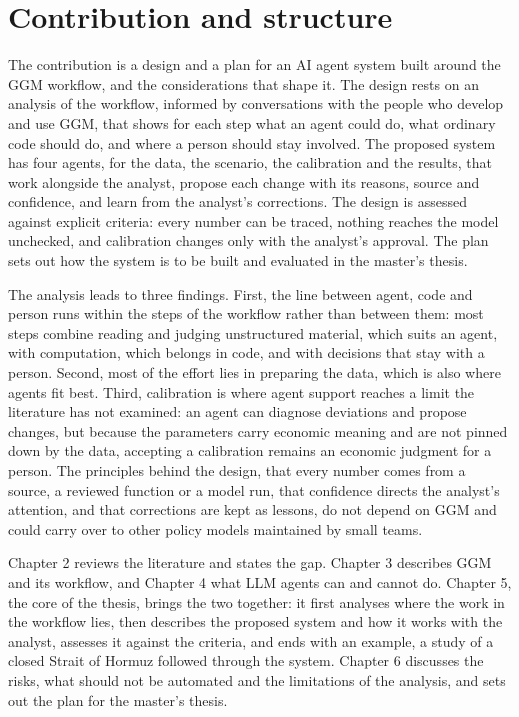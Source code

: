 \section{Contribution and structure}

The contribution is a design and a plan for an AI agent system built around the GGM workflow, and the considerations that shape it.
The design rests on an analysis of the workflow, informed by conversations with the people who develop and use GGM, that shows for each step what an agent could do, what ordinary code should do, and where a person should stay involved.
The proposed system has four agents, for the data, the scenario, the calibration and the results, that work alongside the analyst, propose each change with its reasons, source and confidence, and learn from the analyst's corrections.
The design is assessed against explicit criteria: every number can be traced, nothing reaches the model unchecked, and calibration changes only with the analyst's approval.
The plan sets out how the system is to be built and evaluated in the master's thesis.

The analysis leads to three findings.
First, the line between agent, code and person runs within the steps of the workflow rather than between them: most steps combine reading and judging unstructured material, which suits an agent, with computation, which belongs in code, and with decisions that stay with a person.
Second, most of the effort lies in preparing the data, which is also where agents fit best.
Third, calibration is where agent support reaches a limit the literature has not examined: an agent can diagnose deviations and propose changes, but because the parameters carry economic meaning and are not pinned down by the data, accepting a calibration remains an economic judgment for a person.
The principles behind the design, that every number comes from a source, a reviewed function or a model run, that confidence directs the analyst's attention, and that corrections are kept as lessons, do not depend on GGM and could carry over to other policy models maintained by small teams.

Chapter 2 reviews the literature and states the gap.
Chapter 3 describes GGM and its workflow, and Chapter 4 what LLM agents can and cannot do.
Chapter 5, the core of the thesis, brings the two together: it first analyses where the work in the workflow lies, then describes the proposed system and how it works with the analyst, assesses it against the criteria, and ends with an example, a study of a closed Strait of Hormuz followed through the system.
Chapter 6 discusses the risks, what should not be automated and the limitations of the analysis, and sets out the plan for the master's thesis.
